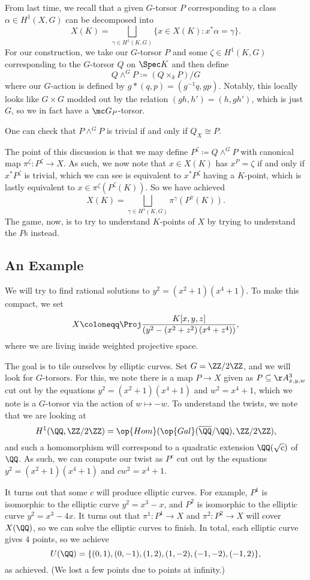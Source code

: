 \documentclass[../notes.tex]{subfiles}
\begin{document}
From last time, we recall that a given $G$-torsor $P$ corresponding to a class $\alpha\in H^1(X,G)$ can be decomposed into
\[X(K)=\bigsqcup_{\gamma\in H^1(K,G)}\{x\in X(K):x^*\alpha=\gamma\}.\]
For our construction, we take our $G$-torsor $P$ and some $\zeta\in H^1(K,G)$ corresponding to the $G$-torsor $Q$ on $\Spec K$ and then define
\[Q\land^GP\coloneqq(Q\times_kP)/G\]
where our $G$-action is defined by $g*(q,p)=\left(g^{-1}q,gp\right)$. Notably, this locally looks like $G\times G$ modded out by the relation $(gh,h')=(h,gh')$, which is just $G$, so we in fact have a $\mc G_P$-torsor.
\begin{remark}
	One can check that $P\land^GP$ is trivial if and only if $Q_X\cong P$.
\end{remark}
The point of this discussion is that we may define $P^\zeta\coloneqq Q\land^GP$ with canonical map $\pi^\zeta\colon P^\zeta\to X$. As such, we now note that $x\in X(K)$ has $x^P=\zeta$ if and only if $x^*P^\zeta$ is trivial, which we can see is equivalent to $x^*P^\zeta$ having a $K$-point, which is lastly equivalent to $x\in\pi^\zeta(P^\zeta(K))$. So we have achieved
\[X(K)=\bigsqcup_{\gamma\in H^1(K,G)}\pi^\gamma(P^\gamma(K)).\]
The game, now, is to try to understand $K$-points of $X$ by trying to understand the $P$s instead.

\subsection{An Example}
We will try to find rational solutions to $y^2=\left(x^2+1\right)\left(x^4+1\right)$. To make this compact, we set
\[X\coloneqq\Proj\frac{K[x,y,z]}{\left(y^2-\left(x^2+z^2\right)\left(x^4+z^4\right)\right)},\]
where we are living inside weighted projective space.

The goal is to tile ourselves by elliptic curves. Set $G=\ZZ/2\ZZ$, and we will look for $G$-torsors. For this, we note there is a map $P\to X$ given as $P\subseteq\AA^3_{x,y,w}$ cut out by the equations $y^2=\left(x^2+1\right)\left(x^4+1\right)$ and $w^2=x^4+1$, which we note is a $G$-torsor via the action of $w\mapsto-w$. To understand the twists, we note that we are looking at
\[H^1(\QQ,\ZZ/2\ZZ)=\op{Hom}(\op{Gal}(\overline\QQ/\QQ),\ZZ/2\ZZ),\]
and such a homomorphism will correspond to a quadratic extension $\QQ(\sqrt c)$ of $\QQ$. As such, we can compute our twist as $P^c$ cut out by the equations $y^2=\left(x^2+1\right)\left(x^4+1\right)$ and $cw^2=x^4+1$.

It turns out that some $c$ will produce elliptic curves. For example, $P^1$ is isomorphic to the elliptic curve $y^2=x^3-x$, and $P^2$ is isomorphic to the elliptic curve $y^2=x^3-4x$. It turns out that $\pi^1\colon P^1\to X$ and $\pi^2\colon P^2\to X$ will cover $X(\QQ)$, so we can solve the elliptic curves to finish. In total, each elliptic curve gives $4$ points, so we achieve
\[U(\QQ)=\{(0,1),(0,-1),(1,2),(1,-2),(-1,-2),(-1,2)\},\]
as achieved. (We lost a few points due to points at infinity.)
\end{document}
